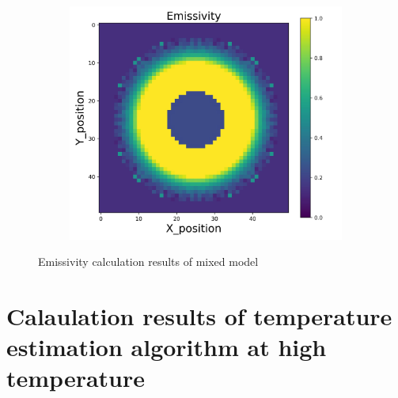 {\begin{figure}[p]
\begin{minipage}{\textwidth}
\begin{subfigure}{0.325\textwidth}
        \end{subfigure}
        \begin{subfigure}{0.325\textwidth}
            \centering
            \includegraphics[width=\textwidth]{figures/raw_data/33/mix/emi_cal.jpg}
        \end{subfigure}
    \end{minipage}
    \caption{Emissivity calculation results of mixed model}  
\end{figure}

\newpage
\section{Calaulation results of temperature estimation algorithm at high temperature}
}
